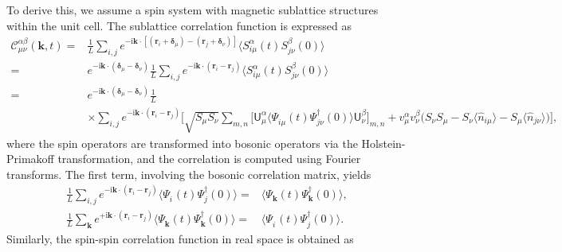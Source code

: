 \documentclass[aps, prx, nofootinbib, superscriptaddress]{revtex4-2}
\newcommand{\kvec}{\mathbf{k}}
\newcommand{\ri}{\mathrm{i}}
\begin{document}
To derive this, we assume a spin system with magnetic sublattice structures within the unit cell. The sublattice correlation function is expressed as
\begin{align}
    \mathcal{C}^{\alpha\beta}_{\mu\nu} (\kvec, t) 
    = & \frac{1}{L} \sum_{i,j} e^{ - \ri \kvec \cdot [(\mathbf{r}_{i} + \mathbf{\delta}_{\mu}) - (\mathbf{r}_{j} + \mathbf{\delta}_{\nu})]} \langle S_{i\mu}^{\alpha}(t) S_{j\nu}^{\beta}(0) \rangle \\
    = & e^{ - \ri \kvec \cdot (\mathbf{\delta}_{\mu} - \mathbf{\delta}_{\nu})}
    \frac{1}{L} \sum_{i,j} e^{ - \ri \kvec \cdot (\mathbf{r}_{i} - \mathbf{r}_{j} )}
    \langle S_{i\mu}^{\alpha}(t) S_{j\nu}^{\beta}(0) \rangle \\
    = & e^{ - \ri \kvec \cdot (\mathbf{\delta}_{\mu} - \mathbf{\delta}_{\nu})}
    \frac{1}{L}  \\
    & \times \sum_{i,j} e^{ - \ri \kvec \cdot (\mathbf{r}_{i} - \mathbf{r}_{j} )} 
    \bigg[
    \sqrt{S_{\mu}S_{\nu}} \sum_{m,n}
    \Big[ \mathsf{U}^{\alpha}_{\mu}
    \big\langle \Psi_{i\mu}^{\phantom \dagger}(t) \Psi_{j\nu}^{\dagger}(0) \big\rangle
    \mathsf{U}^{\beta}_{\nu} \Big]_{m,n} 
    + v_{\mu}^{\alpha} v_{\nu}^{\beta}
    \Big( S_{\nu} S_{\mu} - S_{\nu}\langle \hat{n}_{i\mu} \rangle - S_{\mu}\langle \hat{n}_{j\nu} \rangle \Big)
    \bigg], 
    \nonumber
\end{align}
where the spin operators are transformed into bosonic operators via the Holstein-Primakoff transformation, and the correlation is computed using Fourier transforms. The first term, involving the bosonic correlation matrix, yields
\begin{subequations}
    \begin{align}
        \frac{1}{L} \sum_{i,j}
        e^{ - \ri \kvec \cdot (\mathbf{r}_{i} - \mathbf{r}_{j} )}
        \big\langle \Psi_{i}^{\phantom \dagger}(t) \Psi_{j}^{\dagger}(0) \big\rangle
        = &
        \big\langle \Psi_{\kvec}^{\phantom \dagger}(t) \Psi_{\kvec}^{\dagger}(0) \big\rangle,
        \\
        \frac{1}{L} \sum_{\kvec}
        e^{ + \ri \kvec \cdot (\mathbf{r}_{i} - \mathbf{r}_{j} )} 
        \big\langle \Psi_{\kvec}^{\phantom \dagger}(t) \Psi_{\kvec}^{\dagger}(0) \big\rangle 
        = &
        \big\langle \Psi_{i}^{\phantom \dagger}(t) \Psi_{j}^{\dagger}(0) \big\rangle.
    \end{align}
\end{subequations}
Similarly, the spin-spin correlation function in real space is obtained as
\end{document}

